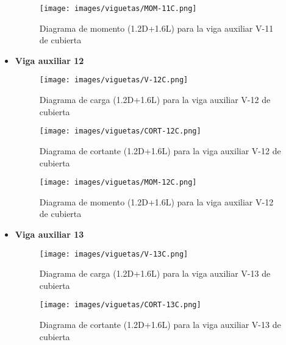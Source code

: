 \begin{itemize}
            \begin{figure}[H]
                \centering
                \texttt{[image: images/viguetas/MOM-11C.png]}
                \caption{Diagrama de momento (1.2D+1.6L) para la viga auxiliar V-11 de cubierta}
                \label{fig:Mom V-11 EP}
            \end{figure}
            
            \item \textbf{Viga auxiliar 12}\\
            \begin{figure}[H]
                \centering
                \texttt{[image: images/viguetas/V-12C.png]}
                \caption{Diagrama de carga (1.2D+1.6L) para la viga auxiliar V-12 de cubierta}
                \label{fig:W V-12 EP}
            \end{figure}
            
            \begin{figure}[H]
                \centering
                \texttt{[image: images/viguetas/CORT-12C.png]}
                \caption{Diagrama de cortante (1.2D+1.6L) para la viga auxiliar V-12 de cubierta}
                \label{fig:Cort V-12 EP}
            \end{figure}
            
            \begin{figure}[H]
                \centering
                \texttt{[image: images/viguetas/MOM-12C.png]}
                \caption{Diagrama de momento (1.2D+1.6L) para la viga auxiliar V-12 de cubierta}
                \label{fig:Mom V-12 EP}
            \end{figure}
            
            
            \item \textbf{Viga auxiliar 13}\\
            \begin{figure}[H]
                \centering
                \texttt{[image: images/viguetas/V-13C.png]}
                \caption{Diagrama de carga (1.2D+1.6L) para la viga auxiliar V-13 de cubierta}
                \label{fig:W V-13 EP}
            \end{figure}
            
            \begin{figure}[H]
                \centering
                \texttt{[image: images/viguetas/CORT-13C.png]}
                \caption{Diagrama de cortante (1.2D+1.6L) para la viga auxiliar V-13 de cubierta}
                \label{fig:Cort V-13 EP}
            \end{figure}
            

\end{itemize}
